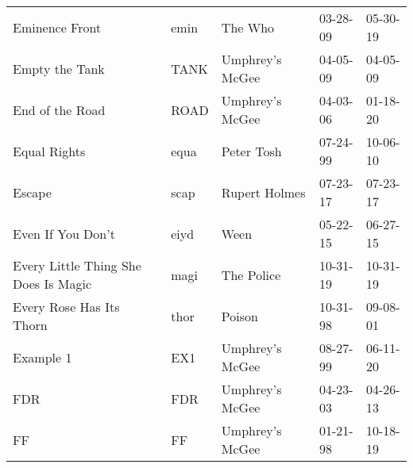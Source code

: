 \begin{longtable}{p{}p{}p{}p{}p{}}
                                                          Eminence Front &          emin &                                                  The Who &              03-28-09 &             05-30-19 \\
                                                          Empty the Tank &          TANK &                                          Umphrey's McGee &              04-05-09 &             04-05-09 \\
                                                         End of the Road &          ROAD &                                          Umphrey's McGee &              04-03-06 &             01-18-20 \\
                                                            Equal Rights &          equa &                                               Peter Tosh &              07-24-99 &             10-06-10 \\
                                                                  Escape &          scap &                                            Rupert Holmes &              07-23-17 &             07-23-17 \\
                                                       Even If You Don't &          eiyd &                                                     Ween &              05-22-15 &             06-27-15 \\
                                    Every Little Thing She Does Is Magic &          magi &                                               The Police &              10-31-19 &             10-31-19 \\
                                                Every Rose Has Its Thorn &          thor &                                                   Poison &              10-31-98 &             09-08-01 \\
                                                               Example 1 &           EX1 &                                          Umphrey's McGee &              08-27-99 &             06-11-20 \\
                                                                     FDR &           FDR &                                          Umphrey's McGee &              04-23-03 &             04-26-13 \\
                                                                      FF &            FF &                                          Umphrey's McGee &              01-21-98 &             10-18-19 \\

\end{longtable}

